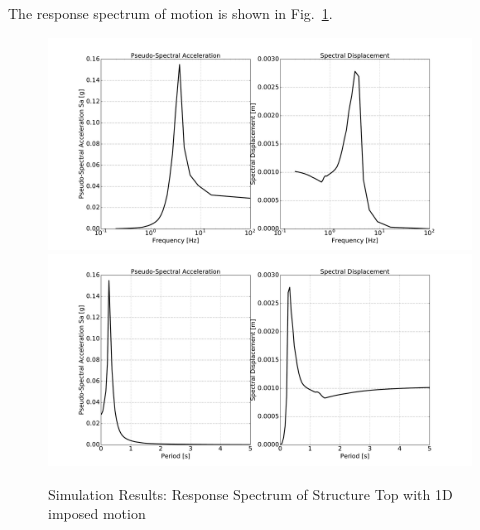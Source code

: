 The response spectrum of motion is shown in Fig.~\ref{fig_spectrum_freq_period_time_series_imposed_1D_motion}.
\begin{figure}[H]
  \centering
  \includegraphics[width = 15cm]{./Figure-files/nonlinear_analysis_steps/structure/imposed_motion/shell_structure_imposed_motion_node_38_x_spectrum_freq.pdf}
  \includegraphics[width = 15cm]{./Figure-files/nonlinear_analysis_steps/structure/imposed_motion/shell_structure_imposed_motion_node_38_x_spectrum_period.pdf}
  \caption{Simulation Results: Response Spectrum of Structure Top with 1D imposed motion}
  \label{fig_spectrum_freq_period_time_series_imposed_1D_motion}
\end{figure}

